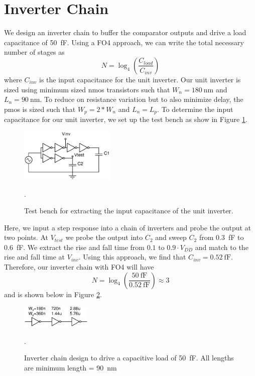 \documentclass[letterpaper, notitlepage]{revtex4-1}
\begin{document}
\section{Inverter Chain}
We design an inverter chain to buffer the comparator outputs and drive a load capacitance of \SI{50}{\femto\farad}. Using a FO4 approach, we can write the total necessary number of stages as
\begin{equation}
N=\log_4\left(\frac{C_{load}}{C_{inv}}\right)
\end{equation}
where $C_{inv}$ is the input capacitance for the unit inverter. Our unit inverter is sized using minimum sized nmos transistors such that $W_n=\SI{180}{\nano\metre}$ and $L_n=\SI{90}{\nano\metre}$. To reduce on resistance variation but to also minimize delay, the pmos is sized such that $W_p=2*W_n$ and $L_n=L_p$. To determine the input capacitance for our unit inverter, we set up the test bench as show in Figure \ref{fig:TestBench}.
\begin{figure}[h]
\begin{center}
\includegraphics[width=0.4\textwidth]{Inverter_Design/TestBench.eps}
\caption{Test bench for extracting the input capacitance of the unit inverter.}.
\label{fig:TestBench}
\end{center}
\end{figure}
Here, we input a step response into a chain of inverters and probe the output at two points. At $V_{test}$ we probe the output into $C_2$ and sweep $C_2$ from \SI{0.3}{\femto\farad} to \SI{0.6}{\femto\farad}. We extract the rise and fall time from $0.1$ to $0.9\cdot V_{DD}$ and match to the rise and fall time at $V_{inv}$. Using this approach, we find that $C_{inv}=\SI{0.52}{\femto\farad}$. Therefore, our inverter chain with FO4 will have
\begin{equation}
N=\log_4\left(\frac{\SI{50}{\femto\farad}}{\SI{0.52}{\femto\farad}}\right)\approx3
\end{equation}
and is shown below in Figure \ref{fig:InvChain}.
\begin{figure}[h]
\begin{center}
\includegraphics[width=0.3\textwidth]{Inverter_Design/Inverter_Chain.eps}
\caption{Inverter chain design to drive a capacitive load of \SI{50}{\femto\farad}. All lengths are minimum length = \SI{90}{\nano\metre}}.
\label{fig:InvChain}
\end{center}
\end{figure}
\end{document}
